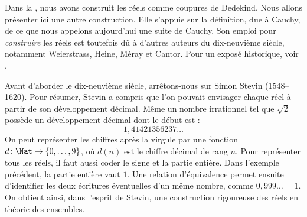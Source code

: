 \documentclass[../../../include/open-logic-section]{subfiles}
\begin{document}


Dans la , nous avons construit les réels comme coupures
de Dedekind. Nous allons présenter ici une autre construction. Elle
s'appuie sur la définition, due à Cauchy, de ce que nous appelons
aujourd'hui une suite de Cauchy. Son emploi pour \emph{construire} les
réels est toutefois dû à d'autres auteurs du dix-neuvième siècle,
notamment Weierstrass, Heine, M\'{e}ray et Cantor. Pour un exposé
historique, voir \citeauthor{OConnorRobertson:RN}
\citeyear{OConnorRobertson:RN}.

Avant d'aborder le dix-neuvième siècle, arrêtons-nous sur Simon Stevin
(1548--1620). Pour résumer, Stevin a compris que l'on pouvait envisager
chaque réel à partir de son développement décimal. Même un nombre
irrationnel tel que $\sqrt{2}$ possède un développement décimal dont
le début est :
\[
1{,}41421356237\ldots
\]
On peut représenter les chiffres après la virgule par une fonction
$d \colon \Nat \to \{0,\ldots,9\}$, où $d(n)$ est le chiffre décimal de rang $n$.
Pour représenter tous les réels, il faut aussi coder le signe et la partie
entière. Dans l'exemple précédent, la partie entière vaut $1$.
Une relation d'équivalence permet ensuite d'identifier les deux
écritures éventuelles d'un même nombre, comme $0{,}999\ldots=1$.
On obtient ainsi, dans l'esprit de Stevin, une construction rigoureuse
des réels en théorie des ensembles.
%
%
%
%
%
%
%
\end{document}
